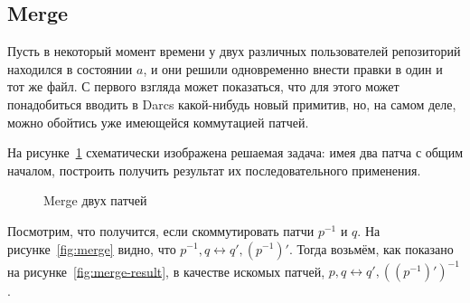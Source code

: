 \subsection{Merge}

Пусть в некоторый момент времени у двух различных пользователей
репозиторий находился в состоянии $a$, и они решили одновременно
внести правки в один и тот же файл. С первого взгляда может
показаться, что для этого может понадобиться вводить в Darcs
какой-нибудь новый примитив, но, на самом деле, можно обойтись уже
имеющейся коммутацией патчей. 

На рисунке~\ref{fig:merge-before} схематически изображена решаемая
задача: имея два патча с общим началом, построить получить результат
их последовательного применения. 

\begin{figure}
  \centering
  \caption{Merge двух патчей}
  \label{fig:merge-before}
\end{figure}

Посмотрим, что получится, если скоммутировать патчи $p^{-1}$ и $q$. На
рисунке~\ref{fig:merge} видно, что $p^{-1}, q \longleftrightarrow q',
(p^{-1})'$. Тогда возьмём, как показано на
рисунке~\ref{fig:merge-result}, в качестве искомых патчей, $p, q
\longleftrightarrow q', ((p^{-1})')^{-1}$.

